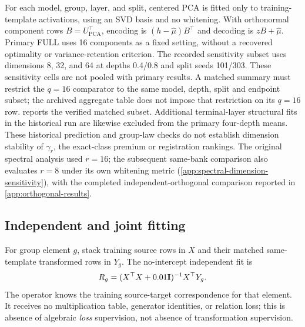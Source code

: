 For each model, group, layer, and split, centered PCA is fitted only to training-template activations, using an SVD basis and no whitening. With orthonormal component rows $B=U_{\mathrm{PCA}}^\top$, encoding is $(h-\hat{\mu})B^\top$ and decoding is $zB+\hat{\mu}$. Primary FULL uses 16 components as a fixed setting, without a recovered optimality or variance-retention criterion. The recorded sensitivity subset uses dimensions 8, 32, and 64 at depths 0.4/0.8 and split seeds 101/303. These sensitivity cells are not pooled with primary results. A matched summary must restrict the $q=16$ comparator to the same model, depth, split and endpoint subset; the archived aggregate table does not impose that restriction on its $q=16$ row.  reports the verified matched subset. Additional terminal-layer structural fits in the historical run are likewise excluded from the primary four-depth means. These historical prediction and group-law checks do not establish dimension stability of $\gamma_r$, the exact-class premium or registration rankings. The original spectral analysis used $r=16$; the subsequent same-bank comparison also evaluates $r=8$ under its own whitening metric (\cref{app:spectral-dimension-sensitivity}), with the completed independent-orthogonal comparison reported in \cref{app:orthogonal-results}.

\subsection{Independent and joint fitting}
For group element $g$, stack training source rows in $X$ and their matched same-template transformed rows in $Y_g$. The no-intercept independent fit is
\[
 R_g=(X^\top X+0.01\mathbf{I})^{-1}X^\top Y_g.
\]
The operator knows the training source-target correspondence for that element. It receives no multiplication table, generator identities, or relation loss; this is absence of algebraic \emph{loss} supervision, not absence of transformation supervision.

